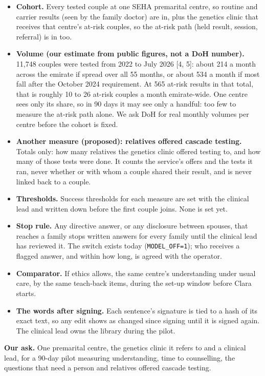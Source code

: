 \documentclass[10.5pt,a4paper]{article}
\newcommand{\code}[1]{\texttt{\small #1}}
\begin{document}
\begin{itemize}
  \item \textbf{Cohort.} Every tested couple at one SEHA premarital centre, so routine and carrier results (seen by the
        family doctor) are in, plus the genetics clinic that receives that centre's at-risk couples, so the at-risk path
        (held result, session, referral) is in too.
  \item \textbf{Volume (our estimate from public figures, not a DoH number).} 11,748 couples were tested from 2022 to
        July 2026 [4, 5]: about 214 a month across the emirate if spread over all 55 months, or about 534 a month if most
        fall after the October 2024 requirement. At 565 at-risk results in that total, that is roughly 10 to 26 at-risk
        couples a month emirate-wide. One centre sees only its share, so in 90 days it may see only a handful: too few to
        measure the at-risk path alone. We ask DoH for real monthly volumes per centre before the cohort is fixed.
  \item \textbf{Another measure (proposed): relatives offered cascade testing.} Totals only: how many relatives the genetics
        clinic offered testing to, and how many of those tests were done. It counts the service's offers and the tests
        it ran, never whether or with whom a couple shared their result, and is never linked back to a couple.
  \item \textbf{Thresholds.} Success thresholds for each measure are set with the clinical lead and written down before
        the first couple joins. None is set yet.
  \item \textbf{Stop rule.} Any directive answer, or any disclosure between spouses, that reaches a family stops written
        answers for every family until the clinical lead has reviewed it. The switch exists today
        (\code{MODEL\_OFF=1}); who receives a flagged answer, and within how long, is agreed with the operator.
  \item \textbf{Comparator.} If ethics allows, the same centre's understanding under usual care, by the same teach-back
        items, during the set-up window before Clara starts.
  \item \textbf{The words after signing.} Each sentence's signature is tied to a hash of its exact text, so any edit
        shows as changed since signing until it is signed again. The clinical lead owns the library during the pilot.
\end{itemize}

\begin{note}
\textbf{Our ask.} One premarital centre, the genetics clinic it refers to and a clinical lead, for a 90-day pilot
measuring understanding, time to counselling, the questions that need a person and relatives offered cascade testing.
\end{note}
\end{document}
